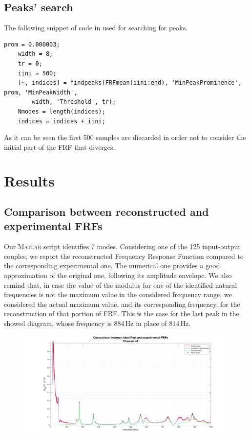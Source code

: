 \documentclass[a4paper,12pt,oneside]{article}
\begin{document}
\subsection{Peaks' search}
\label{peak_search} 

The following snippet of code in used for searching for peaks.

\begin{lstlisting}[caption = {Peaks' search}]
	prom = 0.000003;
	width = 8;
	tr = 0;
	iini = 500;
	[~, indices] = findpeaks(FRFmean(iini:end), 'MinPeakProminence', prom, 'MinPeakWidth',
		width, 'Threshold', tr);
	Nmodes = length(indices);
	indices = indices + iini;
\end{lstlisting}

As it can be seen the first 500 samples are discarded in order not to consider the initial part of the FRF that diverges.

\section{Results}

\subsection{Comparison between reconstructed and experimental FRFs}

Our \textsc{Matlab} script identifies 7 modes. Considering one of the 125 input-output couples, we report the reconstructed Frequency Response Function compared to the corresponding experimental one. The numerical one provides a good approximation of the original one, following its amplitude envelope. We also remind that, in case the value of the modulus for one of the identified natural frequencies is not the maximum value in the considered frequency range, we considered the actual maximum value, and its corresponding frequency, for the reconstruction of that portion of FRF. This is the case for the last peak in the showed diagram, whose frequency is $ 884 \, \text{Hz} $ in place of $ 814 \, \text{Hz} $.

\begin{figure}[H]
	\hspace{-70pt}
	\includegraphics[scale=0.4]{frf_rec_vs_exp_ch45}
\end{figure}
\end{document}
